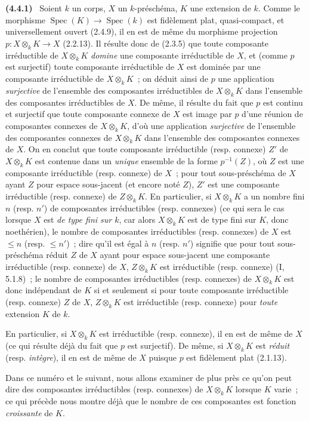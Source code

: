 \documentclass[10pt,oneside]{book}
\newenvironment{env}[1][]{\par\medskip\noindent\textbf{(#1)}\ }{\par}
\begin{document}
\begin{env}[4.4.1]
\label{IV.2.4.4.1-fr}
Soient $k$ un corps, $X$ un $k$-préschéma, $K$ une extension de $k$. Comme le
morphisme $\operatorname{Spec}(K)\to\operatorname{Spec}(k)$ est fidèlement
plat, quasi-compact, et universellement ouvert (2.4.9), il en est de même du
morphisme projection $p:X\otimes_k K\to X$ (2.2.13). Il résulte donc de
(2.3.5) que toute composante irréductible de $X\otimes_k K$ \emph{domine} une
composante irréductible de $X$, et (comme $p$ est surjectif) toute composante
irréductible de $X$ est dominée par une composante irréductible de
$X\otimes_k K$~; on déduit ainsi de $p$ une application \emph{surjective} de
l'ensemble des composantes irréductibles de $X\otimes_k K$ dans l'ensemble
des composantes irréductibles de $X$. De même, il résulte du fait que $p$ est
continu et surjectif que toute composante connexe de $X$ est image par $p$
d'une réunion de composantes connexes de $X\otimes_k K$, d'où une application
\emph{surjective} de l'ensemble des composantes connexes de $X\otimes_k K$
dans l'ensemble des composantes connexes de $X$. On en conclut que toute
composante irréductible (resp. connexe) $Z'$ de $X\otimes_k K$ est contenue
dans un \emph{unique} ensemble de la forme $p^{-1}(Z)$, où $Z$ est une
composante irréductible (resp. connexe) de $X$~; pour tout sous-préschéma de
$X$ ayant $Z$ pour espace sous-jacent (et encore noté $Z$), $Z'$ est une
composante irréductible (resp. connexe) de $Z\otimes_k K$. En particulier, si
$X\otimes_k K$ a un nombre fini $n$ (resp. $n'$) de composantes irréductibles
(resp. connexes) (ce qui sera le cas lorsque $X$ est \emph{de type fini sur
$k$}, car alors $X\otimes_k K$ est de type fini sur $K$, donc noethérien), le
nombre de composantes irréductibles (resp. connexes) de $X$ est $\leqslant n$
(resp. $\leqslant n'$)~; dire qu'il est égal à $n$ (resp. $n'$) signifie que
pour tout sous-préschéma réduit $Z$ de $X$ ayant pour espace sous-jacent une
composante irréductible (resp. connexe) de $X$, $Z\otimes_k K$ est
irréductible (resp. connexe) (I, 5.1.8)~; le nombre de composantes
irréductibles (resp. connexes) de $X\otimes_k K$ est donc indépendant de $K$
si et seulement si pour toute composante irréductible (resp. connexe) $Z$ de
$X$, $Z\otimes_k K$ est irréductible (resp. connexe) pour \emph{toute}
extension $K$ de $k$.

En particulier, si $X\otimes_k K$ est irréductible (resp. connexe), il en est
de même de $X$ (ce qui résulte déjà du fait que $p$ est surjectif). De même, si
$X\otimes_k K$ est \emph{réduit} (resp. \emph{intègre}), il en est de même de
$X$ puisque $p$ est fidèlement plat (2.1.13).

Dans ce numéro et le suivant, nous allons examiner de plus près ce qu'on peut
dire des composantes irréductibles (resp. connexes) de $X\otimes_k K$ lorsque
$K$ varie~; ce qui précède nous montre déjà que le nombre de ces composantes
est fonction \emph{croissante} de $K$.
\end{env}
\end{document}
